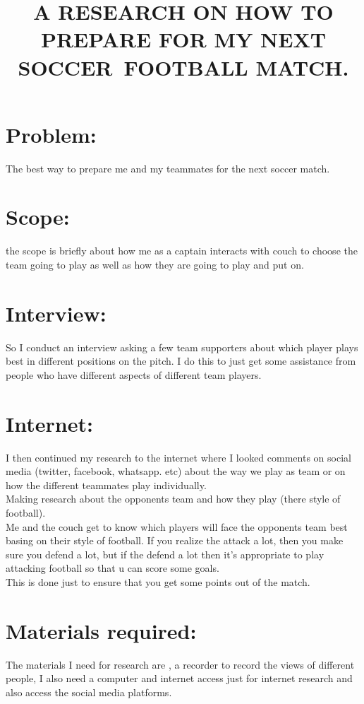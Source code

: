 \documentclass[24pt,a4paper]{article}
\begin{document}
\title{A RESEARCH ON HOW TO PREPARE FOR MY NEXT SOCCER\ FOOTBALL MATCH. }
\maketitle

\section{Problem: }
The best way to prepare me and my teammates for the next soccer match.

\section{Scope: }
 the scope is briefly about how me as a captain interacts with couch to choose the team going to play as well as how they are going to play and put on.
\section{Interview:}
So I conduct an interview asking a few team supporters about which player plays best in different positions on the pitch. I do this to just get some assistance from people who have different aspects of different team players.
\section{Internet:}
I then continued my research to the internet where I looked comments on social media (twitter, facebook, whatsapp. etc) about the way we play as team or on how the different teammates play individually.\\
Making research about the opponents team and how they play (there style of football).\\Me and the couch get to know which players will face the opponents team best basing on their style of football. If you realize the attack a lot, then you make sure you  defend a lot, but if the defend a lot then it’s appropriate to play attacking football so that u can score some goals.\\
This is done just to ensure that you get some points out of the match.

\section{Materials required:}
The materials I need for research are , a recorder  to record the views of different people, I also need  a computer and internet access just for internet research and also access the social media platforms.
\end{document}
